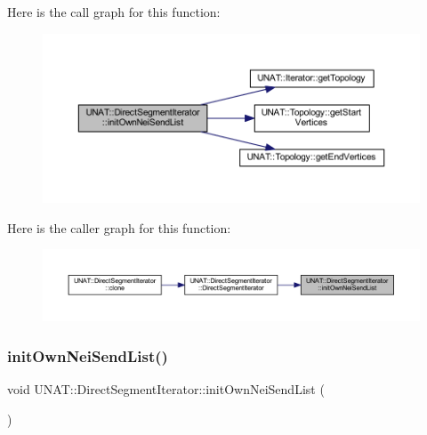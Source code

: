 Here is the call graph for this function\+:
\nopagebreak
\begin{figure}[H]
\begin{center}
\leavevmode
\includegraphics[width=350pt]{classUNAT_1_1DirectSegmentIterator_a425e2615f975bf06a5915105eee718f6_cgraph}
\end{center}
\end{figure}
Here is the caller graph for this function\+:
\nopagebreak
\begin{figure}[H]
\begin{center}
\leavevmode
\includegraphics[width=350pt]{classUNAT_1_1DirectSegmentIterator_a425e2615f975bf06a5915105eee718f6_icgraph}
\end{center}
\end{figure}
\mbox{\label{classUNAT_1_1DirectSegmentIterator_a425e2615f975bf06a5915105eee718f6}} 
\subsubsection{\texorpdfstring{initOwnNeiSendList()}{initOwnNeiSendList()}\hspace{0.1cm}{\footnotesize\ttfamily [2/2]}}
{\footnotesize\ttfamily void U\+N\+A\+T\+::\+Direct\+Segment\+Iterator\+::init\+Own\+Nei\+Send\+List (\begin{DoxyParamCaption}{ }\end{DoxyParamCaption})\hspace{0.3cm}{\ttfamily [private]}}


